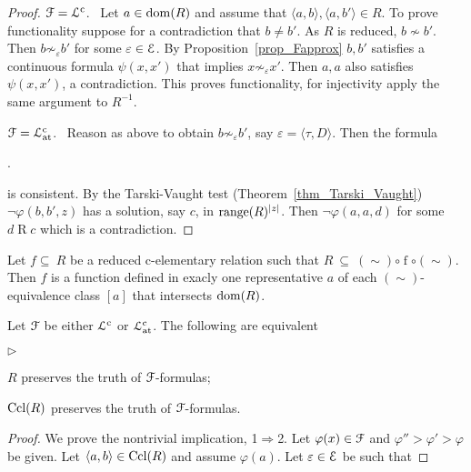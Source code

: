 \documentclass{amsproc}
\newcommand{\mylabel}[1]{{#1}\hfill}
\renewenvironment{itemize}
  {\begin{list}{$\triangleright$}{%
  \setlength{\parskip}{0mm}
  \setlength{\topsep}{.4\baselineskip}
  \setlength{\rightmargin}{0mm}
  \setlength{\listparindent}{0mm}
  \setlength{\itemindent}{0mm}
  \setlength{\labelwidth}{3ex}
  \setlength{\itemsep}{.2\baselineskip}
  \setlength{\parsep}{.2\baselineskip}
  \setlength{\partopsep}{0mm}
  \setlength{\labelsep}{1ex}
  \setlength{\leftmargin}{\labelwidth+\labelsep}
  \let\makelabel\mylabel}}{%
\end{list}}
\begin{document}
{\begin{proof}
  ${\EuScript F}={\EuScript L}^{\rm c}$. \ 
  Let $a\in{\rm dom}(R)$ and assume that $\langle a,b\rangle,\langle a,b'\rangle\in R$.
  To prove functionality suppose for a contradiction that $b\neq b'$.
  As $R$ is reduced, $b\not\sim b'$.
  Then $b\not\sim_\varepsilon b'$ for some $\varepsilon\in{\EuScript E}$.
  By Proposition~\ref{prop_Fapprox} $b,b'$ satisfies a continuous formula $\psi(x,x')$ that implies  $x\not\sim_\varepsilon x'$.
  Then $a,a$ also satisfies $\psi(x,x')$, a contradiction.
  This proves functionality, for injectivity apply the same argument to $R^{-1}$.

  ${\EuScript F}={\EuScript L}^{\rm c}_{\rm at}$. \ 
  Reason as above to obtain $b\not\sim_\varepsilon b'$, say $\varepsilon=\langle\tau,D\rangle$.
  Then the formula 
  
  .
  
  is consistent.
  By the Tarski-Vaught test (Theorem~\ref{thm_Tarski_Vaught}) $\neg\varphi(b,b',z)$ has a solution, say $c$, in ${\rm range}(R)^{|z|}$.
  Then $\neg\varphi(a,a,d)$ for some $d\mathrel{R} c$ which is a contradiction.
\end{proof}

Let $f \subseteq\ R$ be a reduced c-elementary relation such that $R\ \subseteq\ \mathrel{(\sim)}\circ \mathrel{f}\circ\mathrel{(\sim)}$.
Then $f$ is a function defined in exacly one representative $a$ of each $(\sim)$-equivalence class $[a]$ that intersects ${\rm dom}(R)$.

\begin{fact}\label{fact_Rcompletion}
  Let ${\EuScript F}$ be either ${\EuScript L}^{\rm c}$ or ${\EuScript L}^{\rm c}_{\rm at}$.
  The following are equivalent
  \begin{itemize}
    \item[1.] $R$ preserves the truth of ${\EuScript F}$-formulas;
    \item[2.] ${\rm Ccl}(R)$ preserves the truth of ${\EuScript F}$-formulas.
  \end{itemize}
\end{fact}

\begin{proof}
  We prove the nontrivial implication, 1$\Rightarrow$2.
  Let $\varphi(x)\in{\EuScript F}$ and $\varphi''>\varphi'>\varphi$ be given.
  Let $\langle a,b\rangle\in{\rm Ccl}(R)$ and assume $\varphi(a)$.
  Let $\varepsilon\in{\EuScript E}$ be such that 


\end{proof}}
\end{document}
